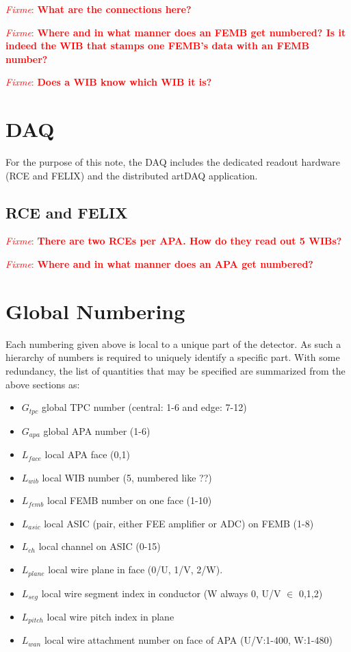 \documentclass[pdftex,12pt,letter]{article}
\newcommand{\fixme}[1]{\textcolor{red}{\textit{Fixme}: \textbf{#1}}}
\begin{document}
\fixme{What are the connections here?}

\fixme{Where and in what manner does an FEMB get numbered?  Is it indeed the WIB that stamps one FEMB's data with an FEMB number?}

\fixme{Does a WIB know which WIB it is?}

\section{DAQ}

For the purpose of this note, the DAQ includes the dedicated readout
hardware (RCE and FELIX) and the distributed artDAQ application.

\subsection{RCE and FELIX}

\fixme{There are two RCEs per APA.  How do they read out 5 WIBs?}

\fixme{Where and in what manner does an APA get numbered?}

\section{Global Numbering}

Each numbering given above is local to a unique part of the detector.
As such a hierarchy of numbers is required to uniquely identify a
specific part.  With some redundancy, the list of quantities that may
be specified are summarized from the above sections as:

\begin{itemize}
\item $G_{tpc}$ global TPC number (central: 1-6 and edge: 7-12)
\item $G_{apa}$ global APA number (1-6)
\item $L_{face}$ local APA face (0,1)
\item $L_{wib}$ local WIB number (5, numbered like ??)
\item $L_{femb}$ local FEMB number on one face (1-10)
\item $L_{asic}$ local ASIC (pair, either FEE amplifier or ADC) on FEMB (1-8)
\item $L_{ch}$ local channel on ASIC (0-15)
\item $L_{plane}$ local wire plane in face (0/U, 1/V, 2/W).
\item $L_{seg}$ local wire segment index in conductor (W always 0, U/V $\in$ 0,1,2)
\item $L_{pitch}$ local wire pitch index in plane
\item $L_{wan}$ local wire attachment number on face of APA (U/V:1-400, W:1-480)
\end{itemize}
\end{document}
